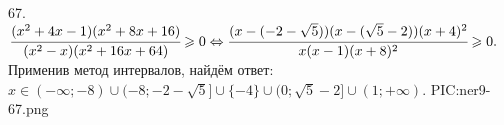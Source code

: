 67. $\cfrac{(x^2+4x-1)(x^2+8x+16)}{(x^2-x)(x^2+16x+64)}\geqslant0\Leftrightarrow
\cfrac{(x-(-2-\sqrt{5}))(x-(\sqrt{5}-2))(x+4)^2}{x(x-1)(x+8)^2}\geqslant0.$ Применив метод интервалов, найдём ответ: $x\in
(-\infty;-8)\cup(-8;-2-\sqrt{5}]\cup\{-4\}\cup(0;\sqrt{5}-2]\cup(1;+\infty).$
{{PIC:ner9-67.png}}\\
